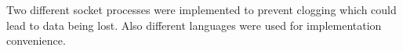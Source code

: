 Two different socket processes were implemented to prevent clogging which could lead to data being lost. Also different languages were used for implementation convenience.


%	
%
%	
%
%
%
%

